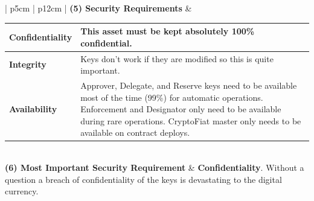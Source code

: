 \documentclass[a4paper,12pt]{article} %
\begin{document}
{\begin{center}
{\begin{tabular}{ | p{5cm} | p{12cm} | }
  \textbf{(5) Security Requirements} &
  	\hskip-0.2cm
  	\begin{tabular}{p{2.5cm}|p{9.06cm}}
		\textbf{Confidentiality} & This asset must be kept absolutely 100\% confidential.
		\\ \hline
		\textbf{Integrity} & Keys don't work if they are modified so this is quite important.
		\\ \hline
		\textbf{Availability} & Approver, Delegate, and Reserve keys need to be available most of the time (99\%) for automatic operations. Enforcement and Designator only need to be available during rare operations. CryptoFiat master only needs to be available on contract deploys.
	\end{tabular}
  \\ \hline
  \textbf{(6) Most Important Security Requirement} & \textbf{Confidentiality}. Without a question a breach of confidentiality of the keys is devastating to the digital currency.
  \\ \hline
\end{tabular}
}
\end{center}
\label{tab:assetProfileEthereumAdminKeys}

}
\end{document}
